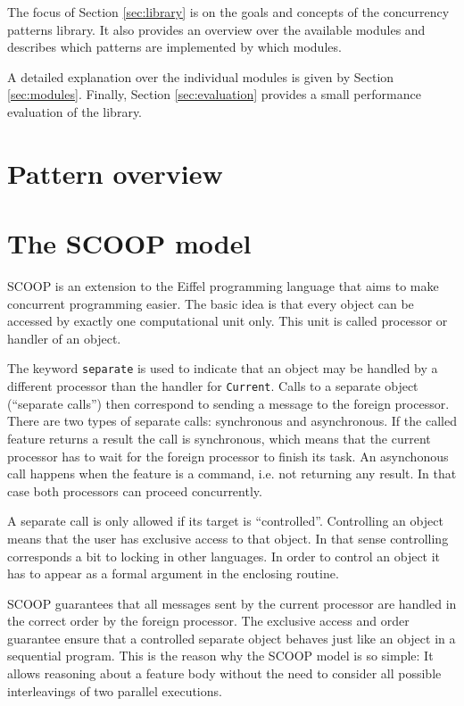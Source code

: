 \documentclass[a4paper,10pt,titlepage]{article}
\begin{document}
The focus of Section \ref{sec:library} is on the goals and concepts of the concurrency patterns library.
It also provides an overview over the available modules and describes which patterns are implemented by which modules.

A detailed explanation over the individual modules is given by Section \ref{sec:modules}.
Finally, Section \ref{sec:evaluation} provides a small performance evaluation of the library.

\section {Pattern overview}
\label{sec:pattern_overview}



\section {The SCOOP model}
\label {sec:scoop-model}

SCOOP is an extension to the Eiffel programming language that aims to make concurrent programming easier.
The basic idea is that every object can be accessed by exactly one computational unit only.
This unit is called processor or handler of an object.

The keyword \lstinline!separate! is used to indicate that an object may be handled by a different processor than the handler for \lstinline!Current!.
Calls to a separate object (``separate calls'') then correspond to sending a message to the foreign processor.
There are two types of separate calls: synchronous and asynchronous.
If the called feature returns a result the call is synchronous, which means that the current processor has to wait for the foreign processor to finish its task.
An asynchonous call happens when the feature is a command, i.e. not returning any result.
In that case both processors can proceed concurrently.

A separate call is only allowed if its target is ``controlled''.
Controlling an object means that the user has exclusive access to that object.
In that sense controlling corresponds a bit to locking in other languages.
In order to control an object it has to appear as a formal argument in the enclosing routine.

SCOOP guarantees that all messages sent by the current processor are handled in the correct order by the foreign processor.
The exclusive access and order guarantee ensure that a controlled separate object behaves just like an object in a sequential program.
This is the reason why the SCOOP model is so simple: 
It allows reasoning about a feature body without the need to consider all possible interleavings of two parallel executions.
\end{document}
